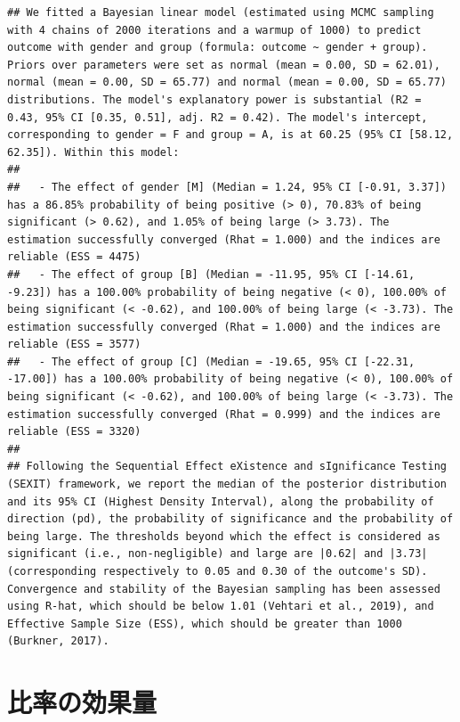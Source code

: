 \documentclass[
  ja=standard, xelatex, base=12pt]{bxjsreport}
\begin{document}
\begin{verbatim}
## We fitted a Bayesian linear model (estimated using MCMC sampling with 4 chains of 2000 iterations and a warmup of 1000) to predict outcome with gender and group (formula: outcome ~ gender + group). Priors over parameters were set as normal (mean = 0.00, SD = 62.01), normal (mean = 0.00, SD = 65.77) and normal (mean = 0.00, SD = 65.77) distributions. The model's explanatory power is substantial (R2 = 0.43, 95% CI [0.35, 0.51], adj. R2 = 0.42). The model's intercept, corresponding to gender = F and group = A, is at 60.25 (95% CI [58.12, 62.35]). Within this model:
## 
##   - The effect of gender [M] (Median = 1.24, 95% CI [-0.91, 3.37]) has a 86.85% probability of being positive (> 0), 70.83% of being significant (> 0.62), and 1.05% of being large (> 3.73). The estimation successfully converged (Rhat = 1.000) and the indices are reliable (ESS = 4475)
##   - The effect of group [B] (Median = -11.95, 95% CI [-14.61, -9.23]) has a 100.00% probability of being negative (< 0), 100.00% of being significant (< -0.62), and 100.00% of being large (< -3.73). The estimation successfully converged (Rhat = 1.000) and the indices are reliable (ESS = 3577)
##   - The effect of group [C] (Median = -19.65, 95% CI [-22.31, -17.00]) has a 100.00% probability of being negative (< 0), 100.00% of being significant (< -0.62), and 100.00% of being large (< -3.73). The estimation successfully converged (Rhat = 0.999) and the indices are reliable (ESS = 3320)
## 
## Following the Sequential Effect eXistence and sIgnificance Testing (SEXIT) framework, we report the median of the posterior distribution and its 95% CI (Highest Density Interval), along the probability of direction (pd), the probability of significance and the probability of being large. The thresholds beyond which the effect is considered as significant (i.e., non-negligible) and large are |0.62| and |3.73| (corresponding respectively to 0.05 and 0.30 of the outcome's SD). Convergence and stability of the Bayesian sampling has been assessed using R-hat, which should be below 1.01 (Vehtari et al., 2019), and Effective Sample Size (ESS), which should be greater than 1000 (Burkner, 2017).
\end{verbatim}

\hypertarget{ux6bd4ux7387ux306eux52b9ux679cux91cf}{%
\chapter{比率の効果量}\label{ux6bd4ux7387ux306eux52b9ux679cux91cf}}
\end{document}
